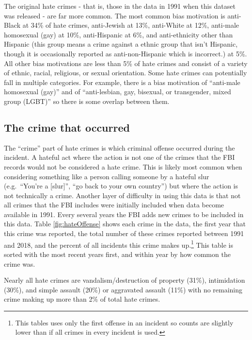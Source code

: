 \documentclass[
  12pt,
  openany]{book}
\begin{document}
The original hate crimes - that is, those in the data in 1991 when this dataset was released - are far more common. The most common bias motivation is anti-Black at 34\% of hate crimes, anti-Jewish at 13\%, anti-White at 12\%, anti-male homosexual (gay) at 10\%, anti-Hispanic at 6\%, and anti-ethnicity other than Hispanic (this group means a crime against a ethnic group that isn't Hispanic, though it is occasionally reported as anti-non-Hispanic which is incorrect.) at 5\%. All other bias motivations are less than 5\% of hate crimes and consist of a variety of ethnic, racial, religious, or sexual orientation. Some hate crimes can potentially fall in multiple categories. For example, there is a bias motivation of ``anti-male homosexual (gay)'' and of ``anti-lesbian, gay, bisexual, or transgender, mixed group (LGBT)'' so there is some overlap between them.

\hypertarget{the-crime-that-occurred}{%
\subsection{The crime that occurred}\label{the-crime-that-occurred}}

The ``crime'' part of hate crimes is which criminal offense occurred during the incident. A hateful act where the action is not one of the crimes that the FBI records would not be considered a hate crime. This is likely most common when considering something like a person calling someone by a hateful slur (e.g.~``You're a {[}slur{]}'', ``go back to your own country'') but where the action is not technically a crime. Another layer of difficulty in using this data is that not all crimes that the FBI includes were initially included when data become available in 1991. Every several years the FBI adds new crimes to be included in this data. Table \ref{fig:hateOffense} shows each crime in the data, the first year that this crime was reported, the total number of these crimes reported between 1991 and 2018, and the percent of all incidents this crime makes up.\footnote{This tables uses only the first offense in an incident so counts are slightly lower than if all crimes in every incident is used.} This table is sorted with the most recent years first, and within year by how common the crime was.

Nearly all hate crimes are vandalism/destruction of property (31\%), intimidation (30\%), and simple assault (20\%) or aggravated assault (11\%) with no remaining crime making up more than 2\% of total hate crimes.
\end{document}
